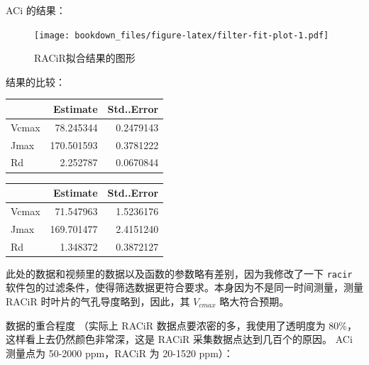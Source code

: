 \documentclass[
]{krantz}
\begin{document}
ACi 的结果：

\begin{figure}
\centering
\texttt{[image: bookdown\_files/figure-latex/filter-fit-plot-1.pdf]}
\caption{\label{fig:filter-fit-plot}RACiR拟合结果的图形}
\end{figure}

结果的比较：

\begin{tabular}{l|r|r}
\hline
  & Estimate & Std..Error\\
\hline
Vcmax & 78.245344 & 0.2479143\\
\hline
Jmax & 170.501593 & 0.3781222\\
\hline
Rd & 2.252787 & 0.0670844\\
\hline
\end{tabular}

\begin{tabular}{l|r|r}
\hline
  & Estimate & Std..Error\\
\hline
Vcmax & 71.547963 & 1.5236176\\
\hline
Jmax & 169.701477 & 2.4151240\\
\hline
Rd & 1.348372 & 0.3872127\\
\hline
\end{tabular}

此处的数据和视频里的数据以及函数的参数略有差别，因为我修改了一下 \texttt{racir} 软件包的过滤条件，使得筛选数据更符合要求。本身因为不是同一时间测量，测量 RACiR 时叶片的气孔导度略到，因此，其 \(V_{cmax}\) 略大符合预期。

数据的重合程度 （实际上 RACiR 数据点要浓密的多，我使用了透明度为 80\%，这样看上去仍然颜色非常深，这是 RACiR 采集数据点达到几百个的原因。 ACi 测量点为 50-2000 ppm，RACiR 为 20-1520 ppm）：
\end{document}
